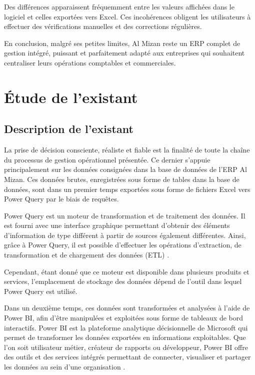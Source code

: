 \documentclass[a4paper,12pt]{report}
\begin{document}
Des différences apparaissent fréquemment entre les valeurs affichées dans le logiciel et celles exportées vers Excel. Ces incohérences obligent les utilisateurs à effectuer des vérifications manuelles et des corrections régulières.

En conclusion, malgré ses petites limites, Al Mizan reste un ERP complet de gestion intégré, puissant et parfaitement adapté aux entreprises qui souhaitent centraliser leurs opérations comptables et commerciales.

\section{Étude de l'existant}

\subsection{Description de l'existant}

La prise de décision consciente, réaliste et fiable est la finalité de toute la
chaîne du processus de gestion opérationnel présentée. Ce dernier s'appuie
principalement sur les données consignées dans la base de données de l'ERP
Al Mizan. Ces données brutes, enregistrées sous forme de tables dans la base de
données, sont dans un premier temps exportées sous forme de fichiers Excel vers
Power Query par le biais de requêtes.

Power Query est un moteur de transformation et de traitement des données. Il est
fourni avec une interface graphique permettant d'obtenir des éléments
d'information de type différent à partir de sources également différentes. Ainsi,
grâce à Power Query, il est possible d'effectuer les opérations d'extraction, de
transformation et de chargement des données (ETL) \cite{ref1}.

Cependant, étant donné que ce moteur est disponible dans plusieurs produits et
services, l'emplacement de stockage des données dépend de l'outil dans lequel
Power Query est utilisé.

Dans un deuxième temps, ces données sont transformées et analysées à l'aide de
Power BI, afin d'être manipulées et exploitées sous forme de tableaux de bord
interactifs. Power BI est la plateforme analytique décisionnelle de Microsoft qui
permet de transformer les données exportées en informations exploitables. Que
l'on soit utilisateur métier, créateur de rapports ou développeur, Power BI offre
des outils et des services intégrés permettant de connecter, visualiser et
partager les données au sein d'une organisation \cite{ref2}.
\end{document}
